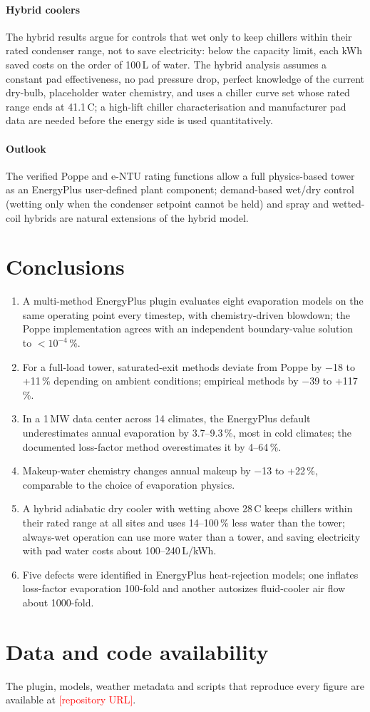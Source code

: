 \documentclass[preprint,12pt,authoryear]{elsarticle}
\newcommand{\tbd}[1]{\textcolor{red}{[#1]}}
\begin{document}
\paragraph{Hybrid coolers} The hybrid results argue for controls that wet only to keep chillers within their rated
condenser range, not to save electricity: below the capacity limit, each kWh saved costs on the order of 100\,L of water.
The hybrid analysis assumes a constant pad effectiveness, no pad pressure drop, perfect knowledge of the current
dry-bulb, placeholder water chemistry, and uses a chiller curve set whose rated range ends at 41.1\,\textdegree C; a
high-lift chiller characterisation and manufacturer pad data are needed before the energy side is used quantitatively.

\paragraph{Outlook} The verified Poppe and e-NTU rating functions allow a full physics-based tower as an EnergyPlus
user-defined plant component; demand-based wet/dry control (wetting only when the condenser setpoint cannot be held)
and spray and wetted-coil hybrids are natural extensions of the hybrid model.

\section{Conclusions}
\begin{enumerate}
\item A multi-method EnergyPlus plugin evaluates eight evaporation models on the same operating point every timestep,
with chemistry-driven blowdown; the Poppe implementation agrees with an independent boundary-value solution to
$<10^{-4}$\,\%.
\item For a full-load tower, saturated-exit methods deviate from Poppe by $-$18 to +11\,\% depending on ambient
conditions; empirical methods by $-$39 to +117\,\%.
\item In a 1\,MW data center across 14 climates, the EnergyPlus default underestimates annual evaporation by
3.7--9.3\,\%, most in cold climates; the documented loss-factor method overestimates it by 4--64\,\%.
\item Makeup-water chemistry changes annual makeup by $-$13 to +22\,\%, comparable to the choice of evaporation physics.
\item A hybrid adiabatic dry cooler with wetting above 28\,\textdegree C keeps chillers within their rated range at all
sites and uses 14--100\,\% less water than the tower; always-wet operation can use more water than a tower, and saving
electricity with pad water costs about 100--240\,L/kWh.
\item Five defects were identified in EnergyPlus heat-rejection models; one inflates loss-factor evaporation
100-fold and another autosizes fluid-cooler air flow about 1000-fold.
\end{enumerate}

\section*{Data and code availability}
The plugin, models, weather metadata and scripts that reproduce every figure are available at \tbd{repository URL}.



\end{document}

